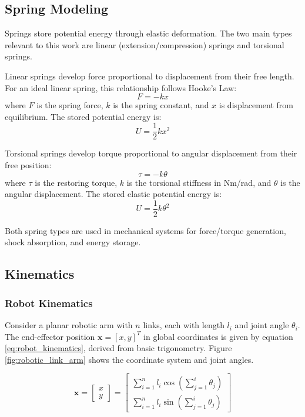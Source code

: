 \subsection{Spring Modeling}
\label{sec:spring_theory}
Springs store potential energy through elastic deformation. The two main types relevant to this work are linear (extension/compression) springs and torsional springs.

Linear springs develop force proportional to displacement from their free length. For an ideal linear spring, this relationship follows Hooke's Law:
\begin{equation}
    F = -kx
\end{equation}
where $F$ is the spring force, $k$ is the spring constant, and $x$ is displacement from equilibrium. The stored potential energy is:
\begin{equation}
    U = \frac{1}{2}kx^2
\end{equation}

Torsional springs develop torque proportional to angular displacement from their free position:
\begin{equation}
    \tau = -k\theta
\end{equation}
where $\tau$ is the restoring torque, $k$ is the torsional stiffness in Nm/rad, and $\theta$ is the angular displacement. The stored elastic potential energy is:
\begin{equation}
    U = \frac{1}{2}k\theta^2
\end{equation}

Both spring types are used in mechanical systems for force/torque generation, shock absorption, and energy storage.

\subsection{Kinematics}
    \subsubsection{Robot Kinematics}
    \label{sec:robot_kinematics}
Consider a planar robotic arm with $n$ links, each with length $l_i$ and joint angle $\theta_i$. The end-effector position $\bm{x} = [x, y]^T$ in global coordinates is given by equation \ref{eq:robot_kinematics}, derived from basic trigonometry. Figure \ref{fig:robotic_link_arm} shows the coordinate system and joint angles.

\begin{equation}
    \label{eq:robot_kinematics}
    \bm{x} = \begin{bmatrix}
        x \\
        y
    \end{bmatrix} = \begin{bmatrix}
        \sum_{i=1}^{n} l_i \cos\left(\sum_{j=1}^{i} \theta_j\right) \\
        \sum_{i=1}^{n} l_i \sin\left(\sum_{j=1}^{i} \theta_j\right)
    \end{bmatrix}
\end{equation}

